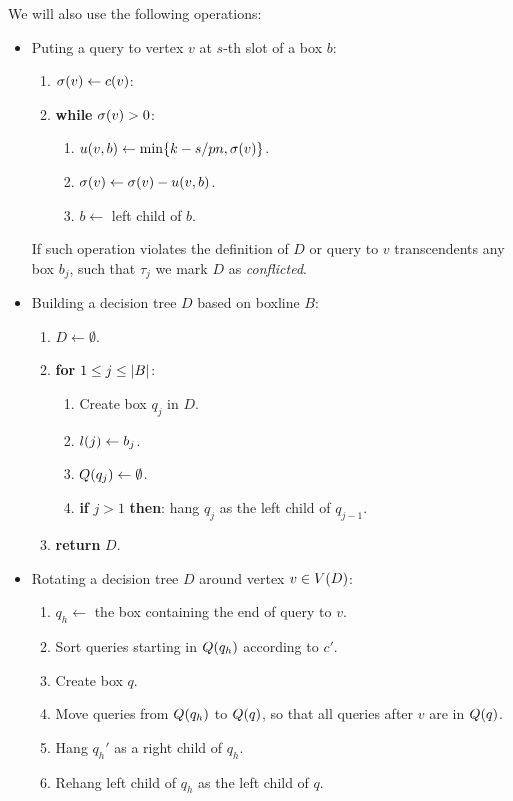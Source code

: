 We will also use the following operations: 
\begin{itemize}
    \item Puting a query to vertex $v$ at $s$-th slot of a box $b$:
    \begin{enumerate}
        \item $\sigma\mathopen{}\left( v \right)\gets c\mathopen{}\left( v \right)$: 
        \item \textbf{while} $\sigma\mathopen{}\left( v \right)>0$: 
        \begin{enumerate}
            \item $u\mathopen{}\left( v, b \right)\gets\min\mathopen{}\left\{ k-s/pn, \sigma\mathopen{}\left( v \right) \right\}$.
            \item $\sigma\mathopen{}\left( v \right)\gets \sigma\mathopen{}\left( v \right)-u\mathopen{}\left( v, b \right)$. 
            \item $b\gets$ left child of $b$.
        \end{enumerate}
    \end{enumerate} If such operation violates the definition of $D$ or query to $v$ transcendents any box $b_j$, such that $\tau_j$ we mark $D$ as \textit{conflicted}.  
    \item Building a decision tree $D$ based on boxline $B$:
    \begin{enumerate}
        \item $D\gets\emptyset$.
        \item \textbf{for} $1\leq j\leq \mathopen{}\left| B \right|$:
        \begin{enumerate}
            \item Create box $q_j$ in $D$.
            \item $l\mathopen{}\left( j \right)\gets b_j$.
            \item $Q\mathopen{}\left( q_j \right)\gets\emptyset$.
            \item \textbf{if} $j>1$ \textbf{then}: hang $q_j$ as the left child of $q_{j-1}$.
        \end{enumerate}
        \item \textbf{return} $D$.
    \end{enumerate} 
    \item Rotating a decision tree $D$ around vertex $v\in V\mathopen{}\left( D \right)$: 
    \begin{enumerate}
        \item $q_h\gets $ the box containing the end of query to $v$.
        \item Sort queries starting in $Q\mathopen{}\left( q_h \right)$ according to $c'$.
        \item Create box $q$.
        \item Move queries from $Q\mathopen{}\left( q_h \right)$ to $Q\mathopen{}\left( q \right)$, so that all queries after $v$ are in $Q\mathopen{}\left( q \right)$.
        \item Hang $q_h'$ as a right child of $q_h$.
        \item Rehang left child of $q_h$ as the left child of $q$. 
    \end{enumerate}
    

\end{itemize}
